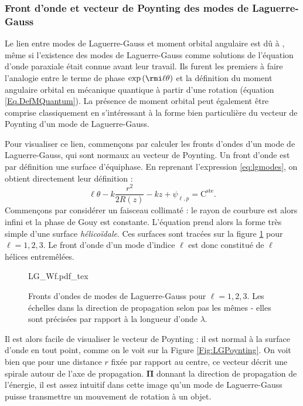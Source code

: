 \subsubsection{Front d'onde et vecteur de Poynting des modes de Laguerre-Gauss}
Le lien entre modes de Laguerre-Gauss et moment orbital angulaire est dû à , même si l'existence des modes de Laguerre-Gauss comme solutions de l'équation d'onde paraxiale était connue avant leur travail. Ils furent les premiers à faire l'analogie entre le terme de phase $\exp{({\rmi}\ell \theta )}$ et la définition du moment angulaire orbital en mécanique quantique à partir d'une rotation (équation \ref{Eq.DefMQuantum}). La présence de moment orbital peut également être comprise classiquement en s'intéressant à la forme bien particulière du vecteur de Poynting d'un mode de Laguerre-Gauss.\par
Pour visualiser ce lien, commençons par calculer les fronts d'ondes d'un mode de Laguerre-Gauss, qui sont normaux au vecteur de Poynting.
Un front d'onde est par définition une surface d'équiphase. En reprenant l'expression \ref{eq:lgmodes}, on obtient directement leur définition :
\begin{equation*}
\ell\theta-k\frac{r^2}{2R(z)}-kz+\psi _{\ell ,p} = \mathrm{C}^\mathrm{ste}.
\end{equation*}
Commençons par considérer un faisceau collimaté : le rayon de courbure est alors infini et la phase de Gouy est constante. L'équation prend alors la forme très simple d'une surface \textit{hélicoïdale}. Ces surfaces sont tracées sur la figure \ref{Fig:LGwf} pour $\ell = 1,2,3$. Le front d'onde d'un mode d'indice $\ell$ est donc constitué de $\ell$ hélices entremêlées.
\begin{figure}[!ht]
\centering
\def\svgwidth{\columnwidth}
{LG_Wf.pdf_tex}
\caption{Fronts d'ondes de modes de Laguerre-Gauss pour $\ell=1,2,3$. Les échelles dans la direction de propagation selon pas les mêmes - elles sont précisées par rapport à la longueur d'onde $\lambda$.}
\label{Fig:LGwf}
\end{figure}

Il est alors facile de visualiser le vecteur de Poynting : il est normal à la surface d'onde en tout point, comme on le voit sur la Figure \ref{Fig:LGPoynting}. On voit bien que pour une distance $r$ fixée par rapport au centre, ce vecteur décrit une spirale autour de l'axe de propagation. $\bm{\Pi}$ donnant la direction de propagation de l'énergie, il est assez intuitif dans cette image qu'un mode de Laguerre-Gauss puisse transmettre un mouvement de rotation à un objet.

